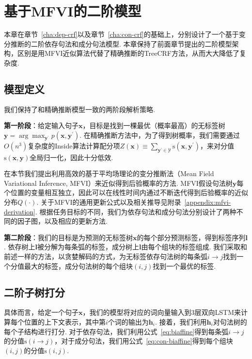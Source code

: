 \section{基于MFVI的二阶模型}\label{sec:vi-2o-approach}

本章在章节~\ref{cha:dep-crf}以及章节~\ref{cha:con-crf}的基础上，分别设计了一个基于变分推断的二阶依存句法和成分句法模型.
本章保持了前面章节提出的二阶模型架构，区别是用MFVI近似算法代替了精确推断的TreeCRF方法，从而大大降低了复杂度.

\subsection{模型定义}\label{sec:vi-model-definition}

我们保持了和精确推断模型一致的两阶段解析策略.

\noindent\textbf{第一阶段}：给定输入句子$\boldsymbol{x}$，目标是找到一棵最优（概率最高）的无标签树$\boldsymbol{y}=\arg\max_{\boldsymbol{y}^{\prime}}p(\boldsymbol{x},\boldsymbol{y}^{\prime})$.
在精确推断方法中，为了得到树概率，我们需要通过$O(n^3)$复杂度的Inside算法计算配分项$Z(\boldsymbol{x})\equiv\sum_{\boldsymbol{y}^{\prime}\in\mathcal{Y}}\mathrm{s}(\boldsymbol{x},\boldsymbol{y}^{\prime})$，来对分值$\mathrm{s}(\boldsymbol{x},\boldsymbol{y})$全局归一化，因此十分低效.

在本节我们提出利用高效的基于平均场理论的变分推断法（Mean Field Variational Inference, MFVI）来近似得到后验概率的方法.
MFVI假设句法树$\boldsymbol{y}$每个位置的变量相互独立，因此可以在线性时间内通过不断迭代得到后验概率的近似分布$Q(\cdot)$.
关于MFVI的通用更新公式以及相关推导见附录~\ref{appendix:mfvi-derivation}.
根据任务目标的不同，我们为依存句法和成分句法分别设计了两种不同的因子图，以及相应的更新方法.

\noindent\textbf{第二阶段}：我们的目标是为预测的无标签树$\boldsymbol{x}$的每个部分预测标签，得到标签序列$\boldsymbol{l}$.
依存树上$\boldsymbol{l}$被分解为每条弧的标签，成分树上$\boldsymbol{l}$由每个组块的标签组成.
我们采取和前述一样的方法，以贪婪解码的方式，为无标签依存句法树的每条弧$i\rightarrow j$找到一个分值最大的标签，成分句法树的每个组块$(i,j)$找到一个最优的标签.

\subsection{二阶子树打分}

具体而言，给定一个句子$\boldsymbol{x}$，我们的模型将对应的词向量输入到3层双向LSTM来计算每个位置的上下文表示，其中第$i$个词的输出为$\mathbf{h}_i$.
接着，我们利用$\mathbf{h}_i$对句法树的每个子结构进行打分.
对于依存句法，我们利用公式~\ref{eq:biaffine}得到每条弧$i\rightarrow j$的分值$\mathrm{s}(i\rightarrow j)$，对于成分句法，我们用公式~\ref{eq:con-biaffine}得到每个组块$(i, j)$的分值$\mathrm{s}(i, j)$.

